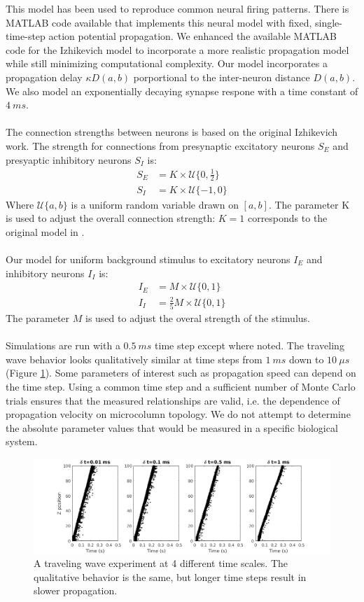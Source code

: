 \documentclass[a4paper,11pt]{article}
\begin{document}
This model has been used to reproduce common neural firing patterns.
There is MATLAB code available \cite{izzy_code} that implements this neural model with fixed, single-time-step action potential propagation.
We enhanced the available MATLAB code for the Izhikevich model to incorporate a more realistic propagation model while still minimizing computational complexity.
Our model incorporates a propagation delay $\kappa D(a,b)$ porportional to the inter-neuron distance $D(a,b)$. 
We also model an exponentially decaying synapse respone with a time constant of $4~ms$.
\\ \\
The connection strengths between neurons is based on the original Izhikevich work.
The strength for connections from presynaptic excitatory neurons $S_E$ and presyaptic inhibitory neurons $S_I$ is:
\begin{align}
 S_E &= K \times \mathcal{U}\{0,\frac{1}{2} \} \\
 S_I &= K \times \mathcal{U}\{-1,0 \} 
\end{align}
Where $\mathcal{U}\{a,b \}$ is a uniform random variable drawn on $[ a,b ] $.
The parameter K is used to adjust the overall connection strength: $K=1$ corresponds to the original model in \cite{izzy_code}. 
\\ \\
Our model for uniform background stimulus to excitatory neurons $I_E$ and inhibitory neurons $I_I$ is: 
\begin{align}
 I_E &= M \times \mathcal{U}\{0,1 \} \\
 I_I &= \frac{2}{5} M \times \mathcal{U}\{0,1 \}
\end{align}
The parameter $M$ is used to adjust the overal strength of the stimulus.
\\ \\
Simulations are run with a $0.5~ms$ time step except where noted.
The traveling wave behavior looks qualitatively similar at time steps from $1~ms$ down to $10~\mu s$ (Figure \ref{fig:time_step}).
Some parameters of interest such as propagation speed can depend on the time step.
Using a common time step and a sufficient number of Monte Carlo trials ensures that the measured relationships are valid, i.e. the dependence of propagation velocity on microcolumn topology.
We do not attempt to determine the absolute parameter values that would be measured in a specific biological system.
\begin{figure}[!htb]
 \centering
 \includegraphics[width=\textwidth]{fig/TimeStepEffect}
  \caption{A traveling wave experiment at 4 different time scales. The qualitative behavior is the same, but longer time steps result in slower propagation.}
 \label{fig:time_step}
\end{figure}
\end{document}
